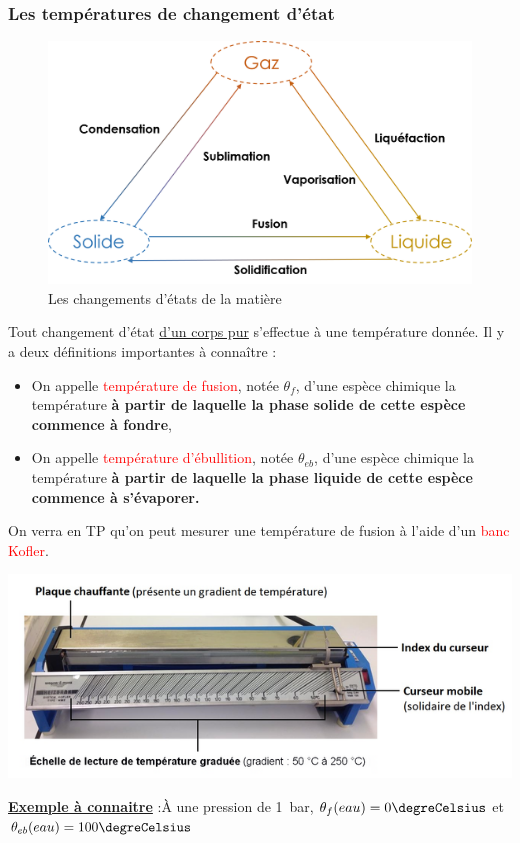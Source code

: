 \subsubsection{Les températures de changement d'état}
\begin{figure}[!htb]
    \centering
    \includegraphics[scale=0.5]{Images/Changement_etat_complet.png}
    \caption{Les changements d'états de la matière}
    \label{fig:enter-label}
\end{figure}
Tout changement d'état \underline{d'un corps pur} s'effectue à une température donnée. Il y a deux définitions importantes à connaître :
\begin{itemize}
    \item On appelle \textcolor{red}{température de fusion}, notée $\theta_f$, d'une espèce chimique la température \textbf{à partir de laquelle la phase solide de cette espèce commence à fondre},
    \item On appelle \textcolor{red}{température d'ébullition}, notée $\theta_{eb}$, d'une espèce chimique la température \textbf{à partir de laquelle la phase liquide de cette espèce commence à s'évaporer.} 
\end{itemize}
On verra en TP qu'on peut mesurer une température de fusion à l'aide d'un \textcolor{red}{banc Kofler}.

\begin{minipage}{0.6\textwidth}
\includegraphics[width=1\textwidth]{Images/Banc_Kofler.png} 
  \end{minipage}
\begin{minipage}{0.4\textwidth}
\underline{\textbf{Exemple à connaitre}} :\newline \`{A} une pression de 1~bar, $\theta_{f}(eau)=0\degreCelsius$ et $\theta_{eb}(eau)=100\degreCelsius$
  \end{minipage}



